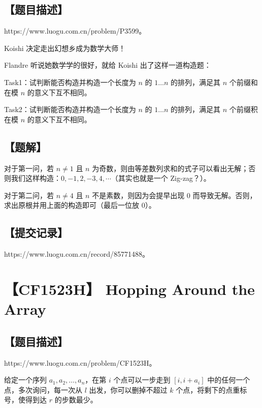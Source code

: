 \documentclass[UTF8,12pt,a4paper]{ctexart}
\begin{document}
	\subsection*{【题目描述】}
	
	https://www.luogu.com.cn/problem/P3599。
	
	Koishi 决定走出幻想乡成为数学大师！
	
	Flandre 听说她数学学的很好，就给 Koishi 出了这样一道构造题：
	
	Task1：试判断能否构造并构造一个长度为 $n$ 的 $1 \dots n$ 的排列，满足其 $n$ 个前缀和在模 $n$ 的意义下互不相同。
	
	Task2：试判断能否构造并构造一个长度为 $n$ 的 $1 \dots n$ 的排列，满足其 $n$ 个前缀积在模 $n$ 的意义下互不相同。
	
	\subsection*{【题解】}
	
	对于第一问，若 $n\neq 1$ 且 $n$ 为奇数，则由等差数列求和的式子可以看出无解；否则我们这样构造：$0,-1,2,-3,4,\cdots$（其实也就是一个 Zig-zag？）。
	
	对于第二问，若 $n\neq 4$ 且 $n$ 不是素数，则因为会提早出现 $0$ 而导致无解。否则，求出原根并用上面的构造即可（最后一位放 $0$）。
	
	
	\subsection*{【提交记录】}
	
	https://www.luogu.com.cn/record/85771488。
	
	
	\section*{【CF1523H】 Hopping Around the Array}
	
	\subsection*{【题目描述】}
	
	https://www.luogu.com.cn/problem/CF1523H。
	
	给定一个序列 $a_1,a_2,\dots,a_n$，在第 $i$ 个点可以一步走到 $[i,i+a_i]$ 中的任何一个点，多次询问，每一次从 $l$ 出发，你可以删掉不超过 $k$ 个点，将剩下的点重标号，使得到达 $r$ 的步数最少。
	
\end{document}
